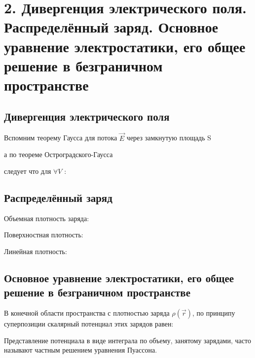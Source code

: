 
\section*{2. Дивергенция электрического поля. Распределённый заряд. Основное
уравнение электростатики, его общее решение в безграничном пространстве}

\subsection*{Дивергенция электрического поля}

Вспомним теорему Гаусса для потока $\vec{E}$ через замкнутую площадь S

а по теореме Остроградского-Гаусса 


следует что для $ \forall V$ :


\subsection*{Распределённый заряд}

Объемная плотность заряда: 


Поверхностная плотность:


Линейная плотность:


\subsection*{Основное
уравнение электростатики, его общее решение в безграничном пространстве}

В конечной области пространства с плотностью заряда $\rho(\vec{r})$, по
принципу суперпозиции скалярный потенциал этих зарядов равен:



Представление потенциала в виде интеграла по объему, занятому зарядами, часто
называют частным решением уравнения Пуассона.

